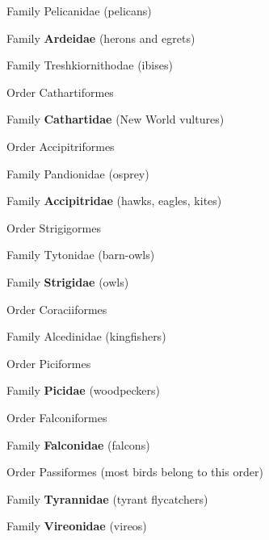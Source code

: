 \documentclass[10pt]{article}
\newlength\mylength
\newcommand*{\growparindent}{\addtolength{\parindent}{\mylength}}
\newcommand*{\reduceparindent}{\addtolength{\parindent}{-1\mylength}}
\begin{document}
\begin{multicols}{2}
\begin{spacing}{1.35}
      	Family Pelicanidae (pelicans)
      	
      	Family \textbf{Ardeidae} (herons and egrets)
      	
      	Family Treshkiornithodae (ibises)
      	
      \reduceparindent
      
      Order Cathartiformes
      
      	\growparindent
      
      	Family \textbf{Cathartidae} (New World vultures)
      	
      \reduceparindent
      
      Order Accipitriformes
      
      	\growparindent
      	
      	Family Pandionidae (osprey)
      	
      	Family \textbf{Accipitridae} (hawks, eagles, kites)
      	
      \reduceparindent
      
      Order Strigigormes
      
      	\growparindent
      	
      	Family Tytonidae (barn-owls)
      	
      	Family \textbf{Strigidae} (owls)
      	
      \reduceparindent
      
      Order Coraciiformes
      
      	\growparindent
      	
      	Family Alcedinidae (kingfishers)
      	
      \reduceparindent
      
      Order Piciformes
      
      	\growparindent
      	
      	Family \textbf{Picidae} (woodpeckers)
      	
	  \reduceparindent
	  
	  Order Falconiformes
	  
	  	\growparindent
	  	
	  	Family \textbf{Falconidae} (falcons)
	  	
	  \reduceparindent
	  
	  Order Passiformes (most birds belong to this order)
	  
	  \growparindent
	  
	  	Family \textbf{Tyrannidae} (tyrant flycatchers)
	  	
	  	Family \textbf{Vireonidae} (vireos)
	  	

\end{spacing}
\end{multicols}
\end{document}
